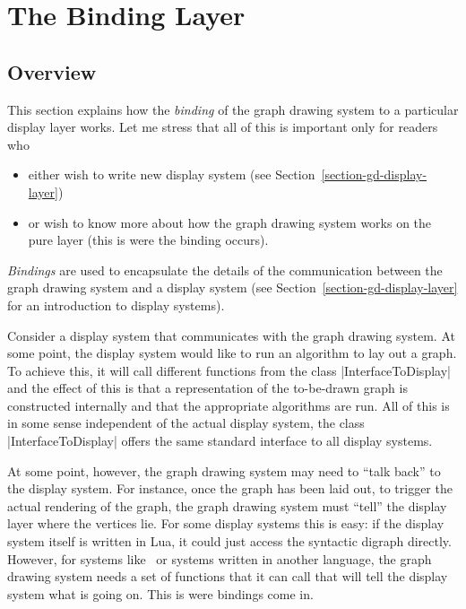 %
%
%


\section{The Binding Layer}

\label{section-gd-binding-layer}


\subsection{Overview}

This section explains how the \emph{binding} of the graph drawing
system to a particular display layer works. Let me stress
that all of this is important only for readers who
\begin{itemize}
\item either wish to write new display system (see
  Section~\ref{section-gd-display-layer})
\item or wish to know more about how the graph drawing system works on
  the pure \pgfname layer (this is were the binding occurs). 
\end{itemize}

\emph{Bindings} are used to encapsulate the details of the
communication between the graph drawing system and a display system
(see Section~\ref{section-gd-display-layer} for an introduction to
display systems).

Consider a display system that communicates with the graph drawing
system. At some point, the display system would like to run an
algorithm to lay out a graph. To achieve this, it will call different
functions from the class |InterfaceToDisplay| and the effect of this
is that a representation of the to-be-drawn graph is constructed
internally and that the appropriate algorithms are run. All of this is
in some sense independent of the actual display system, the class
|InterfaceToDisplay| offers the same standard interface to all display
systems.

At some point, however, the graph drawing system may need to ``talk
back'' to the display system. For instance, once the graph has been
laid out, to trigger the actual rendering of the graph, the graph
drawing system must ``tell'' the display layer where the vertices
lie. For some display systems this is easy: if the display system
itself is written in Lua, it could just access the syntactic digraph
directly. However, for systems like \tikzname\ or systems written in
another language, the graph drawing system needs a set of functions
that it can call that will tell the display system what is going
on. This is were bindings come in.

